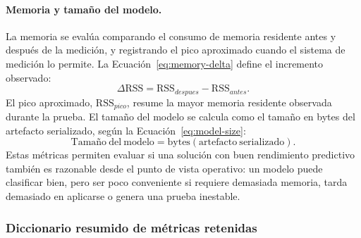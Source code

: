 \documentclass[12pt,oneside]{report}
\begin{document}
\paragraph{Memoria y tamaño del modelo.}
La memoria se evalúa comparando el consumo de memoria residente antes y después de la medición, y registrando el pico aproximado cuando el sistema de medición lo permite. La Ecuación~\eqref{eq:memory-delta} define el incremento observado:
\begin{equation}
\label{eq:memory-delta}
\Delta \mathrm{RSS}=\mathrm{RSS}_{despues}-\mathrm{RSS}_{antes}.
\end{equation}
El pico aproximado, $\mathrm{RSS}_{pico}$, resume la mayor memoria residente observada durante la prueba. El tamaño del modelo se calcula como el tamaño en bytes del artefacto serializado, según la Ecuación~\eqref{eq:model-size}:
\begin{equation}
\label{eq:model-size}
\mathrm{Tamaño\ del\ modelo}=\mathrm{bytes}(\mathrm{artefacto\ serializado}).
\end{equation}
Estas métricas permiten evaluar si una solución con buen rendimiento predictivo también es razonable desde el punto de vista operativo: un modelo puede clasificar bien, pero ser poco conveniente si requiere demasiada memoria, tarda demasiado en aplicarse o genera una prueba inestable.

\subsubsection{Diccionario resumido de métricas retenidas}
\end{document}
